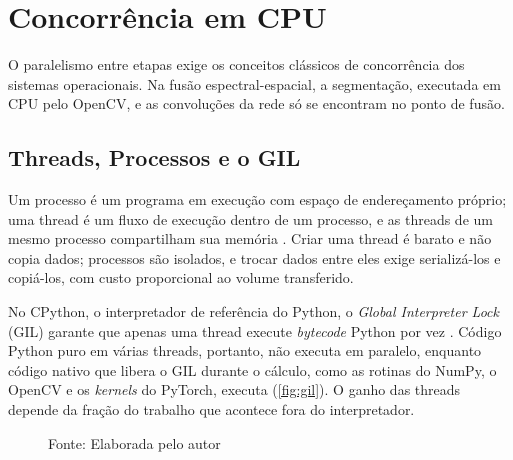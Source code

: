 \section{Concorrência em CPU}
\label{sec:concorrencia}

O paralelismo entre etapas exige os conceitos clássicos de concorrência dos sistemas operacionais. Na fusão espectral-espacial, a segmentação, executada em CPU pelo OpenCV, e as convoluções da rede só se encontram no ponto de fusão.

\subsection{Threads, Processos e o GIL}

Um processo é um programa em execução com espaço de endereçamento próprio; uma thread é um fluxo de execução dentro de um processo, e as threads de um mesmo processo compartilham sua memória \cite{Silberschatz2018}. Criar uma thread é barato e não copia dados; processos são isolados, e trocar dados entre eles exige serializá-los e copiá-los, com custo proporcional ao volume transferido.

No CPython, o interpretador de referência do Python, o \textit{Global Interpreter Lock} (GIL) garante que apenas uma thread execute \textit{bytecode} Python por vez \cite{PEP703}. Código Python puro em várias threads, portanto, não executa em paralelo, enquanto código nativo que libera o GIL durante o cálculo, como as rotinas do NumPy, o OpenCV e os \textit{kernels} do PyTorch, executa (\autoref{fig:gil}). O ganho das threads depende da fração do trabalho que acontece fora do interpretador.

\begin{figure}[H]
    \centering
    \captionsetup{justification=centering}
    \caption{Quatro threads de um processo executando código Python e código nativo que libera o GIL}
    \captionsetup{justification=raggedright}
    \caption*{Fonte: Elaborada pelo autor}
    \label{fig:gil}
\end{figure}

